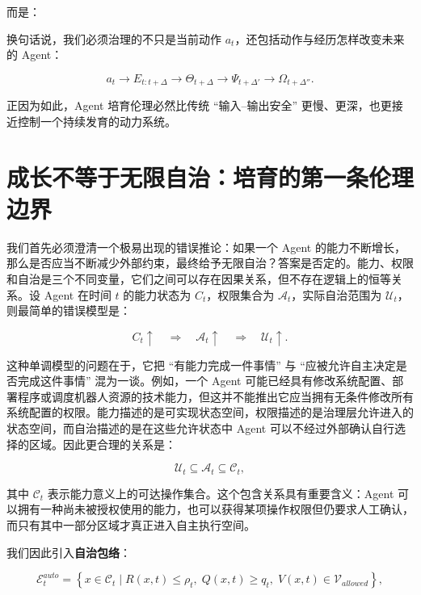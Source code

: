而是：

\begin{statementbox}
\centering
{}
\end{statementbox}

换句话说，我们必须治理的不只是当前动作 $a_t$，还包括动作与经历怎样改变未来的 Agent：

\[
a_t
\rightarrow
E_{t:t+\Delta}
\rightarrow
\Theta_{t+\Delta}
\rightarrow
\Psi_{t+\Delta'}
\rightarrow
\Omega_{t+\Delta''}.
\]

正因为如此，Agent 培育伦理必然比传统 ``输入--输出安全'' 更慢、更深，也更接近控制一个持续发育的动力系统。

\section{成长不等于无限自治：培育的第一条伦理边界}

我们首先必须澄清一个极易出现的错误推论：如果一个 Agent 的能力不断增长，那么是否应当不断减少外部约束，最终给予无限自治？答案是否定的。能力、权限和自治是三个不同变量，它们之间可以存在因果关系，但不存在逻辑上的恒等关系。设 Agent 在时间 $t$ 的能力状态为 $C_t$，权限集合为 $\mathcal{A}_t$，实际自治范围为 $\mathcal{U}_t$，则最简单的错误模型是：

\[
C_t\uparrow
\quad\Longrightarrow\quad
\mathcal A_t\uparrow
\quad\Longrightarrow\quad
\mathcal U_t\uparrow .
\]

这种单调模型的问题在于，它把 ``有能力完成一件事情'' 与 ``应被允许自主决定是否完成这件事情'' 混为一谈。例如，一个 Agent 可能已经具有修改系统配置、部署程序或调度机器人资源的技术能力，但这并不能推出它应当拥有无条件修改所有系统配置的权限。能力描述的是可实现状态空间，权限描述的是治理层允许进入的状态空间，而自治描述的是在这些允许状态中 Agent 可以不经过外部确认自行选择的区域。因此更合理的关系是：

\[
\mathcal U_t
\subseteq
\mathcal A_t
\subseteq
\mathcal C_t ,
\]

其中 $\mathcal C_t$ 表示能力意义上的可达操作集合。这个包含关系具有重要含义：Agent 可以拥有一种尚未被授权使用的能力，也可以获得某项操作权限但仍要求人工确认，而只有其中一部分区域才真正进入自主执行空间。

我们因此引入\textbf{自治包络}：

\[
\mathcal E^{auto}_t
=
\left\{
x \in \mathcal C_t
\mid
R(x,t)\leq \rho_t,\;
Q(x,t)\geq q_t,\;
V(x,t)\in\mathcal V_{allowed}
\right\},
\]

